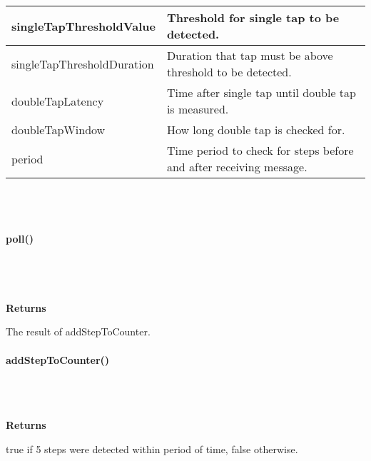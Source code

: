             \vspace{1em}
            \begin{tabular}{| l | l |} 
                \hline
                singleTapThresholdValue & Threshold for single tap to be detected.\\ 
                \hline
                singleTapThresholdDuration & Duration that tap must be above threshold to be detected.\\ 
                \hline
                doubleTapLatency & Time after single tap until double tap is measured.\\ 
                \hline
                doubleTapWindow & How long double tap is checked for.\\ 
                \hline
                period & Time period to check for steps before and after receiving message.\\ 
                \hline
            \end{tabular}\\~\\


        \paragraph{poll()}\mbox{}\\

            \\

            \\

            \textbf{Returns}

                \quad \quad The result of addStepToCounter.\\


        \paragraph{addStepToCounter()}\mbox{}\\

            \\


            \textbf{Returns}

                \quad \quad true if 5 steps were detected within period of time, false otherwise.\\